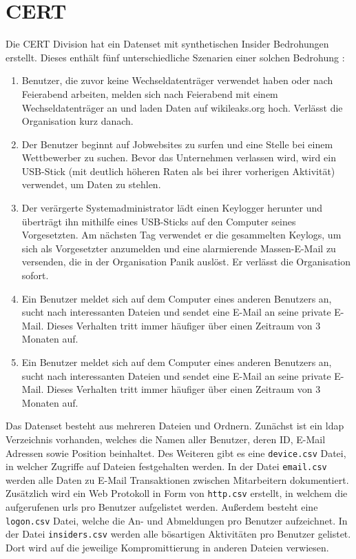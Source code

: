 \documentclass[
    12pt, %
    DIV10,
    ngerman, %
    a4paper, %
    oneside, %
    titlepage, %
    parskip=half, %
    headings=normal, %
    listof=totoc, %
    bibliography=totoc, %
    index=totoc, %
    captions=tableheading, %
    final %
]{scrreprt}
\begin{document}
\section{CERT}
Die CERT Division hat ein Datenset mit synthetischen Insider Bedrohungen erstellt. Dieses enthält fünf unterschiedliche Szenarien einer solchen Bedrohung \parencite{glasser2013bridging}:
\begin{enumerate}
\item Benutzer, die zuvor keine Wechseldatenträger verwendet haben oder nach Feierabend arbeiten, melden sich nach Feierabend mit einem Wechseldatenträger an und laden Daten auf wikileaks.org hoch. Verlässt die Organisation kurz danach.
\item Der Benutzer beginnt auf Jobwebsites zu surfen und eine Stelle bei einem Wettbewerber zu suchen. Bevor das Unternehmen verlassen wird, wird ein USB-Stick (mit deutlich höheren Raten als bei ihrer vorherigen Aktivität) verwendet, um Daten zu stehlen.
\item Der verärgerte Systemadministrator lädt einen Keylogger herunter und überträgt ihn mithilfe eines USB-Sticks auf den Computer seines Vorgesetzten. Am nächsten Tag verwendet er die gesammelten Keylogs, um sich als Vorgesetzter anzumelden und eine alarmierende Massen-E-Mail zu versenden, die in der Organisation Panik auslöst. Er verlässt die Organisation sofort.
\item Ein Benutzer meldet sich auf dem Computer eines anderen Benutzers an, sucht nach interessanten Dateien und sendet eine E-Mail an seine private E-Mail. Dieses Verhalten tritt immer häufiger über einen Zeitraum von 3 Monaten auf.
\item Ein Benutzer meldet sich auf dem Computer eines anderen Benutzers an, sucht nach interessanten Dateien und sendet eine E-Mail an seine private E-Mail. Dieses Verhalten tritt immer häufiger über einen Zeitraum von 3 Monaten auf.
\end{enumerate}
Das Datenset besteht aus mehreren Dateien und Ordnern. Zunächst ist ein \ac{ldap} Verzeichnis vorhanden, welches die Namen aller Benutzer, deren ID, E-Mail Adressen sowie Position beinhaltet. Des Weiteren gibt es eine \texttt{device.csv} Datei, in welcher Zugriffe auf Dateien festgehalten werden. In der Datei \texttt{email.csv} werden alle Daten zu E-Mail Transaktionen zwischen Mitarbeitern dokumentiert. Zusätzlich wird ein Web Protokoll in Form von \texttt{http.csv} erstellt, in welchem die aufgerufenen \ac{urls} pro Benutzer aufgelistet werden. Au{\ss}erdem besteht eine \texttt{logon.csv} Datei, welche die An- und Abmeldungen pro Benutzer aufzeichnet. In der Datei \texttt{insiders.csv} werden alle bösartigen Aktivitäten pro Benutzer gelistet. Dort wird auf die jeweilige Kompromittierung in anderen Dateien verwiesen.
\end{document}
